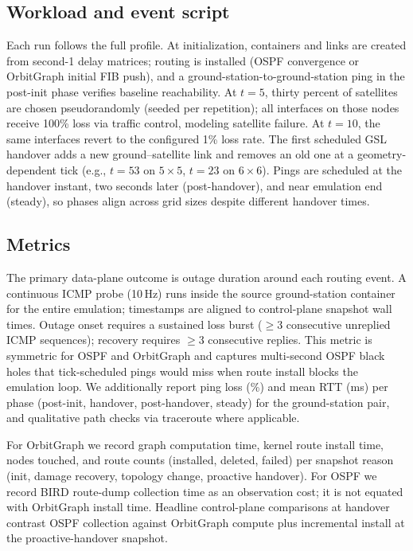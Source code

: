 \subsection{Workload and event script}

Each run follows the full profile.
At initialization, containers and links are created from second-1 delay matrices;
routing is installed (OSPF convergence or OrbitGraph initial FIB push), and a
ground-station-to-ground-station ping in the post-init phase verifies baseline
reachability.
At $t{=}5$, thirty percent of satellites are chosen pseudorandomly (seeded per
repetition); all interfaces on those nodes receive 100\% loss via traffic
control, modeling satellite failure.
At $t{=}10$, the same interfaces revert to the configured 1\% loss rate.
The first scheduled GSL handover adds a new ground--satellite link and removes
an old one at a geometry-dependent tick (e.g., $t{=}53$ on $5{\times}5$,
$t{=}23$ on $6{\times}6$).
Pings are scheduled at the handover instant, two seconds later
(post-handover), and near emulation end (steady), so phases align across grid
sizes despite different handover times.

\subsection{Metrics}

The primary data-plane outcome is outage duration around each routing event.
A continuous ICMP probe (10\,Hz) runs inside the source ground-station
container for the entire emulation; timestamps are aligned to control-plane
snapshot wall times.
Outage onset requires a sustained loss burst ($\geq$3 consecutive unreplied
ICMP sequences); recovery requires $\geq$3 consecutive replies.
This metric is symmetric for OSPF and OrbitGraph and captures multi-second OSPF
black holes that tick-scheduled pings would miss when route install blocks the
emulation loop.
We additionally report ping loss (\%) and mean RTT (ms) per phase (post-init,
handover, post-handover, steady) for the ground-station pair, and qualitative
path checks via traceroute where applicable.

For OrbitGraph we record graph computation time, kernel route install time,
nodes touched, and route counts (installed, deleted, failed) per snapshot
reason (init, damage recovery, topology change, proactive handover).
For OSPF we record BIRD route-dump collection time as an observation cost; it
is not equated with OrbitGraph install time.
Headline control-plane comparisons at handover contrast OSPF collection against
OrbitGraph compute plus incremental install at the proactive-handover snapshot.

